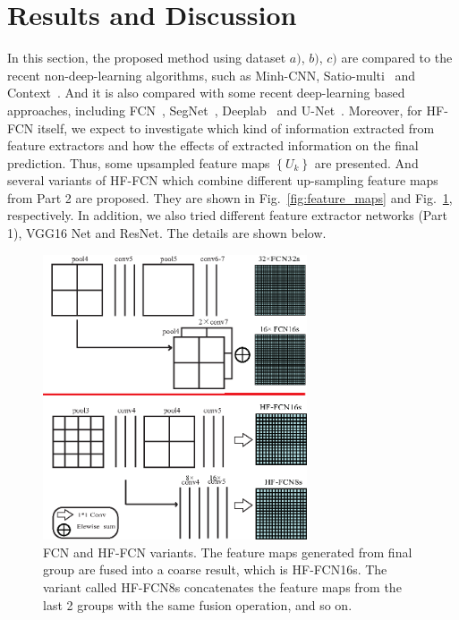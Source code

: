 \section{Results and Discussion}
\label{Sec:Res}

In this section, the proposed method using dataset ${a)}$, ${b)}$, ${c)}$ are compared to the recent non-deep-learning algorithms, such as Minh-CNN\cite{IEEEexample:mnih2013machine}, Satio-multi~\cite{IEEEexample:saito2016multiple} and Context~\cite{IEEEexample:audebert2017deep}.
%
And it is also compared with some recent deep-learning based approaches, including FCN~\cite{IEEEexample:Long_2015_CVPR}, SegNet~\cite{IEEEexample:badrinarayanan2017segnet}, Deeplab~\cite{IEEEexample:chen2016deeplab} and U-Net~\cite{IEEEexample:ronneberger2015u}.
Moreover, for HF-FCN itself, we expect to investigate which kind of information extracted from feature extractors and how the effects of extracted information on the final prediction.
Thus, some upsampled feature maps ${\left\{U_k\right\}}$ are presented.
And several variants of HF-FCN which combine different up-sampling feature maps from Part 2 are proposed.
They are shown in Fig.~\ref{fig:feature_maps} and Fig.~\ref{fig:Variants}, respectively.
In addition, we also tried different feature extractor networks (Part 1), VGG16 Net and ResNet. The details are shown below.

\begin{figure}[t]
\begin{center}
\includegraphics[width=7.8cm]{Figures/vairants.eps}
\caption{FCN and HF-FCN variants. The feature maps generated from final group are fused into a coarse result, which is HF-FCN16s. The variant called HF-FCN8s concatenates the feature maps from the last 2 groups with the same fusion operation, and so on.}
\label{fig:Variants}
\end{center}
\end{figure}


